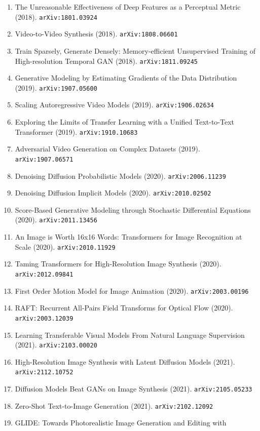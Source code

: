 \documentclass[11pt]{article}
\begin{document}
\begin{enumerate}
  \item The Unreasonable Effectiveness of Deep Features as a Perceptual Metric (2018). \texttt{arXiv:1801.03924}
  \item Video-to-Video Synthesis (2018). \texttt{arXiv:1808.06601}
  \item Train Sparsely, Generate Densely: Memory-efficient Unsupervised Training
  of High-resolution Temporal GAN (2018). \texttt{arXiv:1811.09245}
  \item Generative Modeling by Estimating Gradients of the Data Distribution (2019). \texttt{arXiv:1907.05600}
  \item Scaling Autoregressive Video Models (2019). \texttt{arXiv:1906.02634}
  \item Exploring the Limits of Transfer Learning with a Unified Text-to-Text
  Transformer (2019). \texttt{arXiv:1910.10683}
  \item Adversarial Video Generation on Complex Datasets (2019). \texttt{arXiv:1907.06571}
  \item Denoising Diffusion Probabilistic Models (2020). \texttt{arXiv:2006.11239}
  \item Denoising Diffusion Implicit Models (2020). \texttt{arXiv:2010.02502}
  \item Score-Based Generative Modeling through Stochastic Differential
  Equations (2020). \texttt{arXiv:2011.13456}
  \item An Image is Worth 16x16 Words: Transformers for Image Recognition at
  Scale (2020). \texttt{arXiv:2010.11929}
  \item Taming Transformers for High-Resolution Image Synthesis (2020). \texttt{arXiv:2012.09841}
  \item First Order Motion Model for Image Animation (2020). \texttt{arXiv:2003.00196}
  \item RAFT: Recurrent All-Pairs Field Transforms for Optical Flow (2020). \texttt{arXiv:2003.12039}
  \item Learning Transferable Visual Models From Natural Language Supervision (2021). \texttt{arXiv:2103.00020}
  \item High-Resolution Image Synthesis with Latent Diffusion Models (2021). \texttt{arXiv:2112.10752}
  \item Diffusion Models Beat GANs on Image Synthesis (2021). \texttt{arXiv:2105.05233}
  \item Zero-Shot Text-to-Image Generation (2021). \texttt{arXiv:2102.12092}
  \item GLIDE: Towards Photorealistic Image Generation and Editing with

\end{enumerate}
\end{document}
